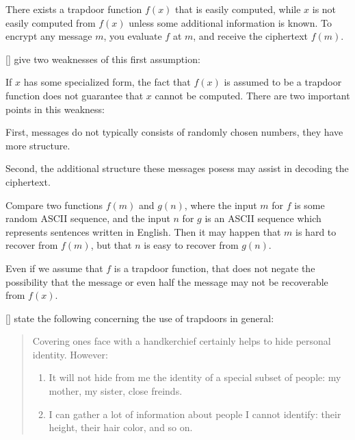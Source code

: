 \begin{asu}
There exists a trapdoor function $f(x)$ that is easily computed, while $x$ is not easily computed from $f(x)$ unless some additional information is known. To encrypt any message $m$, you evaluate $f$ at $m$, and receive the ciphertext $f(m)$.
\end{asu}

[\cite{Gol19820}] give two weaknesses of this first assumption:


\begin{rem}
 If $x$ has some specialized form, the fact that $f(x)$ is assumed to be a trapdoor function does not guarantee that $x$ cannot be computed. There are two important points in this weakness:
\end{rem}

\begin{case}
First, messages do not typically consists of randomly chosen numbers, they have more structure.
\end{case}

\begin{case}
Second, the additional structure these messages posess may assist in decoding the ciphertext.
\end{case} 

\begin{exmp}
Compare two functions $f(m)$ and $g(n)$, where the input $m$ for $f$ is some random ASCII sequence, and the input $n$ for $g$ is an ASCII sequence which represents sentences written in English. Then it may happen that $m$ is hard to recover from $f(m)$, but that $n$ is easy to recover from $g(n)$.
\end{exmp}

\begin{rem}
Even if we assume that $f$ is a trapdoor function, that does not negate the possibility that the message or even half the message may not be recoverable from $f(x)$. 
\end{rem}


[\cite{Gol19820}] state the following concerning the use of trapdoors in general:
\begin{quotation}
    Covering ones face with a handkerchief certainly helps to hide personal identity. However:
    \begin{enumerate}
         \item It will not hide from me the identity of a special subset of people: my mother, my sister, close freinds.
         \item I can gather a lot of information about people I cannot identify: their height, their hair color, and so on.
    \end{enumerate}
\end{quotation}

